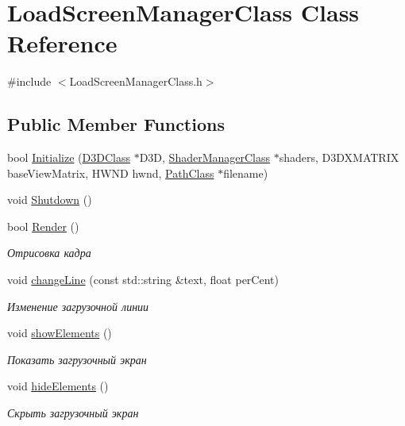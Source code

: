 \hypertarget{class_load_screen_manager_class}{}\section{Load\+Screen\+Manager\+Class Class Reference}
\label{class_load_screen_manager_class}


{\ttfamily \#include $<$Load\+Screen\+Manager\+Class.\+h$>$}

\subsection*{Public Member Functions}
\begin{DoxyCompactItemize}
\item 
bool \hyperlink{class_load_screen_manager_class_ac7453e8b4e715100841d49400a418440}{Initialize} (\hyperlink{class_d3_d_class}{D3\+D\+Class} $\ast$D3D, \hyperlink{class_shader_manager_class}{Shader\+Manager\+Class} $\ast$shaders, D3\+D\+X\+M\+A\+T\+R\+IX base\+View\+Matrix, H\+W\+ND hwnd, \hyperlink{class_path_class}{Path\+Class} $\ast$filename)
\item 
void \hyperlink{class_load_screen_manager_class_adde192a99094683d3193c37935d3ddd0}{Shutdown} ()
\item 
bool \hyperlink{class_load_screen_manager_class_ac173d29a91243ee9ef7bd4342cdcd4f8}{Render} ()
\begin{DoxyCompactList}\small\item\em Отрисовка кадра \end{DoxyCompactList}\item 
void \hyperlink{class_load_screen_manager_class_a6d35c4ec1b681e2d8fb19411d922cd2f}{change\+Line} (const std\+::string \&text, float per\+Cent)
\begin{DoxyCompactList}\small\item\em Изменение загрузочной линии \end{DoxyCompactList}\item 
void \hyperlink{class_load_screen_manager_class_afe8b77ac62afe178004df020bee92385}{show\+Elements} ()
\begin{DoxyCompactList}\small\item\em Показать загрузочный экран \end{DoxyCompactList}\item 
void \hyperlink{class_load_screen_manager_class_af2a306e3f2b0028e838ed76a032e6b75}{hide\+Elements} ()
\begin{DoxyCompactList}\small\item\em Скрыть загрузочный экран \end{DoxyCompactList}\end{DoxyCompactItemize}
